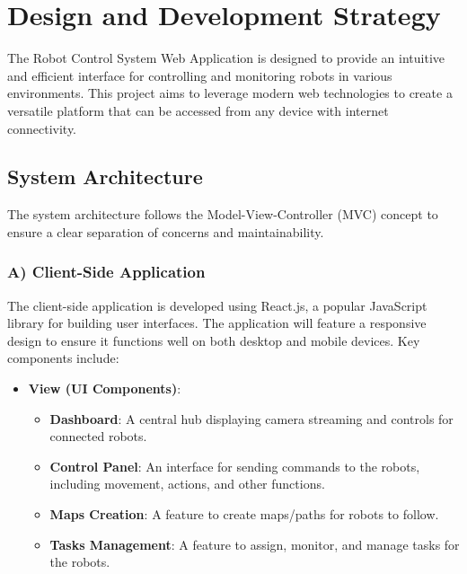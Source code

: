 \section{Design and Development Strategy}

The Robot Control System Web Application is designed to provide an intuitive and efficient interface for controlling and monitoring robots in various environments. This project aims to leverage modern web technologies to create a versatile platform that can be accessed from any device with internet connectivity.

\subsection{System Architecture}
\vspace{-1.5mm}
The system architecture follows the Model-View-Controller (MVC) concept to ensure a clear separation of concerns and maintainability.
\vspace{-3mm}
\subsubsection{A) Client-Side Application}
\vspace{-2.5mm}
The client-side application is developed using React.js, a popular JavaScript library for building user interfaces. The application will feature a responsive design to ensure it functions well on both desktop and mobile devices. Key components include:
\vspace{-1mm}
\begin{itemize}
    \item \textbf{View (UI Components)}:
    \begin{itemize}
    \vspace{-1mm}
        \item \textbf{Dashboard}: A central hub displaying camera streaming and controls for connected robots.
        \vspace{-1mm}
        \item \textbf{Control Panel}: An interface for sending commands to the robots, including movement, actions, and other functions.
        \vspace{-1mm}
        \item \textbf{Maps Creation}: A feature to create maps/paths for robots to follow.
        \vspace{-1mm}
        \item \textbf{Tasks Management}: A feature to assign, monitor, and manage tasks for the robots.
    \end{itemize}
\end{itemize}
\vspace{-3mm}
